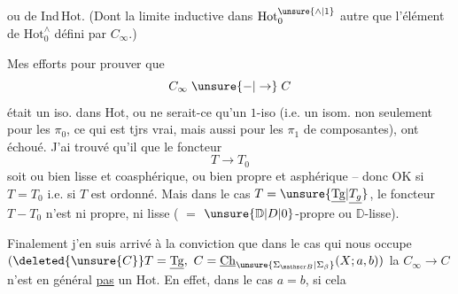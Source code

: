 ou de $\mathrm{Ind\,Hot}$. (Dont la limite inductive dans $\mathrm{Hot}_0^{\unsure{\wedge|1}}$  autre que l'élément de $\mathrm{Hot}_0^\wedge$ défini par $C_\infty$.)

Mes efforts pour prouver que 
\[
C_\infty\mathrel{\unsure{-|\to}}C
\]
était un iso. dans $\mathrm{Hot}$, ou ne serait-ce qu'un $1$-iso (i.e. un isom. non seulement pour les $\pi_0$, ce qui est tjrs vrai, mais aussi pour les $\pi_1$ de   composantes), ont échoué. J'ai trouvé qu'il  que le foncteur
\[
T\longrightarrow T_0
\]
soit ou bien lisse et coasphérique, ou bien propre et asphérique -- donc  OK si $T=T_0$ i.e. si $T$ est ordonné. Mais dans le cas $T=\unsure{\underline{\mathrm{Tg}}|\underline{T_g}}$, le foncteur $T\mathrel{-}T_0$ n'est ni propre, ni lisse ( $=$ $\unsure{\mathbb D|D|0}$-propre ou $\mathbb D$-lisse).

Finalement j'en suis arrivé à la conviction que dans le cas qui nous occupe $(\deleted{\unsure{C}}T=\underline{\mathrm{Tg}},\ C=\underline{\mathrm{Ch}}_{\unsure{\Sigma_{\mathscr B}|\Sigma_\beta}}(X;a,b))$ la   $C_\infty\longrightarrow C$ n'est en général \uline{pas} un   $\mathrm{Hot}$. En effet, dans le cas $a=b$,  si cela
